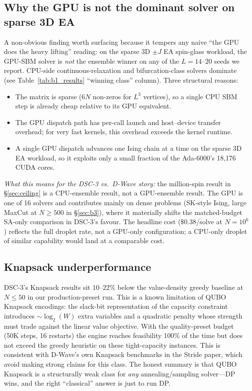 \documentclass[11pt,a4paper]{article}
\begin{document}
\subsection{Why the GPU is not the dominant solver on sparse 3D EA}

A non-obvious finding worth surfacing because it tempers any naive
``the GPU does the heavy lifting'' reading: on the sparse 3D $\pm J$
EA spin-glass workload, the GPU-SBM solver is \emph{not} the ensemble
winner on any of the $L\!=\!14$--$20$ seeds we report. CPU-side
continuous-relaxation and bifurcation-class solvers dominate (see
Table~\ref{tab:b1_results} ``winning class'' column). Three structural reasons:
\begin{itemize}\itemsep0.15em
\item[(a)] The matrix is sparse ($6N$ non-zeros for $L^3$ vertices),
  so a single CPU SBM step is already cheap relative to its GPU
  equivalent.
\item[(b)] The GPU dispatch path has per-call launch and host--device
  transfer overhead; for very fast kernels, this overhead exceeds the
  kernel runtime.
\item[(c)] A single GPU dispatch advances one Ising chain at a time
  on the sparse 3D EA workload, so it exploits only a small fraction
  of the Ada-6000's 18{,}176 CUDA cores.
\end{itemize}

\emph{What this means for the DSC-3 vs.\ D-Wave story:} the
million-spin result in \S\ref{sec:ceiling} is a CPU-ensemble result,
not a GPU-ensemble result. The GPU is one of 16 solvers and contributes
mainly on dense problems (SK-style Ising, large MaxCut at $N\!\ge\!500$
in \S\ref{sec:b3}), where it materially shifts the matched-budget
SA-only comparison in DSC-3's favour. The headline cost
($\$0.38$/solve at $N\!=\!10^{6}$) reflects the full droplet rate, not
a GPU-only configuration; a CPU-only droplet of similar capability
would land at a comparable cost.

\subsection{Knapsack underperformance}

DSC-3's Knapsack results sit $10$--$22\%$ below the value-density
greedy baseline at $N\!\le\!50$ in our production-preset run. This is
a known limitation of QUBO Knapsack encodings: the slack-bit
representation of the capacity constraint introduces $\sim\!\log_2(W)$
extra variables and a quadratic penalty whose strength must trade against
the linear value objective. With the quality-preset budget (50K steps,
16 restarts) the engine reaches feasibility 100\% of the time but does
not exceed the greedy heuristic on these tight-capacity instances. This
is consistent with D-Wave's own Knapsack benchmarks in the Stride paper,
which avoid making strong claims for this class. The honest summary is
that QUBO Knapsack is a structurally weak class for \emph{any}
annealing/sampling solver---DP wins, and the right ``classical'' answer
is just to run DP.
\end{document}
